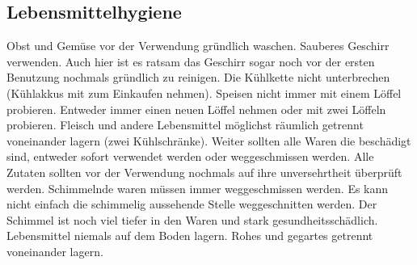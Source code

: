 \subsection{Lebensmittelhygiene}\label{subsec:lebensmittelhygiene}
Obst und Gemüse vor der Verwendung gründlich waschen.
Sauberes Geschirr verwenden.
Auch hier ist es ratsam das Geschirr sogar noch vor der ersten Benutzung nochmals gründlich zu reinigen.
Die Kühlkette nicht unterbrechen (Kühlakkus mit zum Einkaufen nehmen).
Speisen nicht immer mit einem Löffel probieren.
Entweder immer einen neuen Löffel nehmen oder mit zwei Löffeln probieren.
Fleisch und andere Lebensmittel möglichst räumlich getrennt voneinander lagern (zwei Kühlschränke).
Weiter sollten alle Waren die beschädigt sind, entweder sofort verwendet werden oder weggeschmissen werden.
Alle Zutaten sollten vor der Verwendung nochmals auf ihre unversehrtheit überprüft werden.
Schimmelnde waren müssen immer weggeschmissen werden.
Es kann nicht einfach die schimmelig aussehende Stelle weggeschnitten werden.
Der Schimmel ist noch viel tiefer in den Waren und stark gesundheitsschädlich.
Lebensmittel niemals auf dem Boden lagern.
Rohes und gegartes getrennt voneinander lagern.
